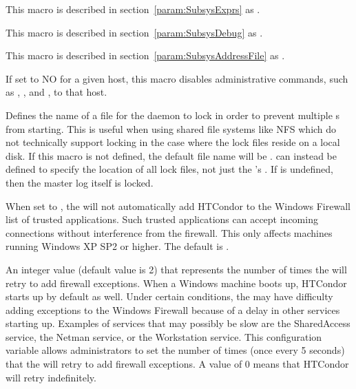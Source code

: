 \begin{description}
\label{param:MasterExprs}
\item[\Macro{MASTER\_ATTRS}]
  This macro is described in section~\ref{param:SubsysExprs} as
  .

\label{param:MasterDebug}
\item[\Macro{MASTER\_DEBUG}]
  This macro is described in section~\ref{param:SubsysDebug} as
  .

\label{param:MasterAddressFile}
\item[\Macro{MASTER\_ADDRESS\_FILE}]
  This macro is described in
  section~\ref{param:SubsysAddressFile} as
  . 

\label{param:AllowAdminCommands}
\item[\Macro{ALLOW\_ADMIN\_COMMANDS}]
  If set to NO for a given host, this
  macro disables administrative commands, such as 
  , , and , to that host.

\label{param:MasterInstanceLock}
\item[\Macro{MASTER\_INSTANCE\_LOCK}]
  Defines the name of a file for the  daemon
  to lock in order to prevent multiple s
  from starting.
  This is useful when using shared file systems like NFS which do
  not technically support locking in the case where the lock files
  reside on a local disk.
  If this macro is not defined, the default file name will be
  .
   can instead be defined to
  specify the location of all lock files, not just the 
  's .
  If  is undefined, then the master log itself is locked.

\label{param:AddWindowsFirewallException}
\item[\Macro{ADD\_WINDOWS\_FIREWALL\_EXCEPTION}]
  When set to , the
   will not automatically add HTCondor to the Windows
  Firewall list of trusted applications. Such trusted applications can
  accept incoming connections without interference from the firewall. This
  only affects machines running Windows XP SP2 or higher. The default
  is .

\label{param:WindowsFirewallFailureRetry} 
\item[\Macro{WINDOWS\_FIREWALL\_FAILURE\_RETRY}]
  An integer value (default value is 2) that represents
  the number of times the  will retry to add
  firewall exceptions.
  When a Windows machine boots
  up, HTCondor starts up by default as well. Under certain conditions, the
   may have difficulty adding exceptions to the Windows
  Firewall because of a delay in other services starting up.
  Examples of services that may possibly be slow are the 
  SharedAccess service, the Netman service, or the Workstation service.
  This configuration variable allows administrators to set the number of
  times (once every 5 seconds) that the  will retry
  to add firewall exceptions. A value of 0 means that HTCondor will
  retry indefinitely.


\end{description}
